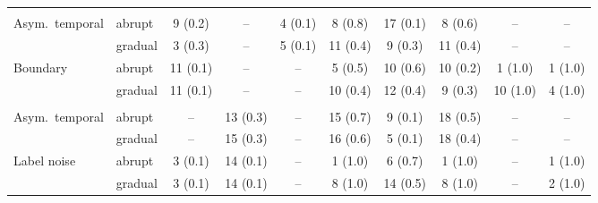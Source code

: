 \begin{tabular}{llcccccccc}
\addlinespace[3pt]
\multicolumn{10}{l}{\textit{IMDb / RoBERTa, $N=200$}} \\
Asym.\ temporal & abrupt & 9 (0.2) & -- & 4 (0.1) & 8 (0.8) & 17 (0.1) & 8 (0.6) & -- & -- \\
 & gradual & 3 (0.3) & -- & 5 (0.1) & 11 (0.4) & 9 (0.3) & 11 (0.4) & -- & -- \\
Boundary & abrupt & 11 (0.1) & -- & -- & 5 (0.5) & 10 (0.6) & 10 (0.2) & 1 (1.0) & 1 (1.0) \\
 & gradual & 11 (0.1) & -- & -- & 10 (0.4) & 12 (0.4) & 9 (0.3) & 10 (1.0) & 4 (1.0) \\
\addlinespace[3pt]
\multicolumn{10}{l}{\textit{Amazon / DistilBERT, $N=200$}} \\
Asym.\ temporal & abrupt & -- & 13 (0.3) & -- & 15 (0.7) & 9 (0.1) & 18 (0.5) & -- & -- \\
 & gradual & -- & 15 (0.3) & -- & 16 (0.6) & 5 (0.1) & 18 (0.4) & -- & -- \\
Label noise & abrupt & 3 (0.1) & 14 (0.1) & -- & 1 (1.0) & 6 (0.7) & 1 (1.0) & -- & 1 (1.0) \\
 & gradual & 3 (0.1) & 14 (0.1) & -- & 8 (1.0) & 14 (0.5) & 8 (1.0) & -- & 2 (1.0) \\
\bottomrule
\end{tabular}